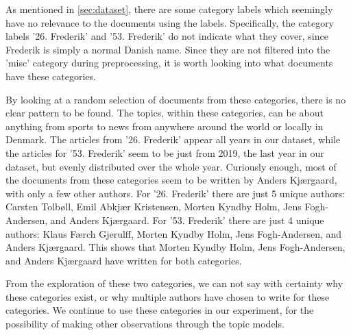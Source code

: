 As mentioned in \autoref{sec:dataset}, there are some category labels which seemingly have no relevance to the documents using the labels.
Specifically, the category labels '26. Frederik' and '53. Frederik' do not indicate what they cover, since Frederik is simply a normal Danish name.
Since they are not filtered into the 'misc' category during preprocessing, it is worth looking into what documents have these categories.

By looking at a random selection of documents from these categories, there is no clear pattern to be found.
The topics, within these categories, can be about anything from sports to news from anywhere around the world or locally in Denmark.
The articles from '26. Frederik' appear all years in our dataset, while the articles for '53. Frederik' seem to be just from 2019, the last year in our dataset, but evenly distributed over the whole year.
Curiously enough, most of the documents from these categories seem to be written by Anders Kjærgaard, with only a few other authors.
For '26. Frederik' there are just 5 unique authors: Carsten Tolbøll, Emil Abkjær Kristensen, Morten Kyndby Holm, Jens Fogh-Andersen, and Anders Kjærgaard.
For '53. Frederik' there are just 4 unique authors: Klaus Færch Gjerulff, Morten Kyndby Holm, Jens Fogh-Andersen, and Anders Kjærgaard.
This shows that Morten Kyndby Holm, Jens Fogh-Andersen, and Anders Kjærgaard have written for both categories.

From the exploration of these two categories, we can not say with certainty why these categories exist, or why multiple authors have chosen to write for these categories.
We continue to use these categories in our experiment, for the possibility of making other observations through the topic models.

